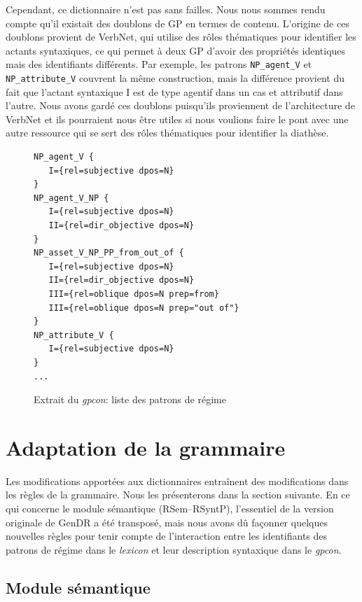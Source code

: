 Cependant, ce dictionnaire n'est pas sans failles. Nous nous sommes rendu compte qu'il existait des doublons de \ac{GP} en termes de contenu. L'origine de ces doublons provient de VerbNet, qui utilise des rôles thématiques pour identifier les actants syntaxiques, ce qui permet à deux \ac{GP} d'avoir des propriétés identiques mais des identifiants différents. Par exemple, les patrons \texttt{NP\_agent\_V} et \texttt{NP\_attribute\_V} couvrent la même construction, mais la différence provient du fait que l'actant syntaxique I est de type agentif dans un cas et attributif dans l'autre. Nous avons gardé ces doublons puisqu'ils proviennent de l'architecture de VerbNet et ils pourraient nous être utiles si nous voulions faire le pont avec une autre ressource qui se sert des rôles thématiques pour identifier la diathèse.

\begin{figure}[htb]
  \caption{Extrait du \emph{gpcon}: liste des patrons de régime}
	\label{fig:4entries-gpcon}
\begin{lstlisting}[language=mate]
NP_agent_V {
   I={rel=subjective dpos=N}
}
NP_agent_V_NP {
   I={rel=subjective dpos=N}
   II={rel=dir_objective dpos=N}
}
NP_asset_V_NP_PP_from_out_of {
   I={rel=subjective dpos=N}
   II={rel=dir_objective dpos=N}
   III={rel=oblique dpos=N prep=from}
   III={rel=oblique dpos=N prep="out of"}
}
NP_attribute_V {
   I={rel=subjective dpos=N}
}
...
\end{lstlisting}
\end{figure}

\section{Adaptation de la grammaire}

Les modifications apportées aux dictionnaires entraînent des modifications dans les règles de la grammaire. Nous les présenterons dans la section suivante. En ce qui concerne le module sémantique (\ac{RSem}--\ac{RSyntP}), l'essentiel de la version originale de GenDR a été transposé, mais nous avons dû façonner quelques nouvelles règles pour tenir compte de l'interaction entre les identifiants des patrons de régime dans le \emph{lexicon} et leur description syntaxique dans le \emph{gpcon}.

\subsection{Module sémantique}

